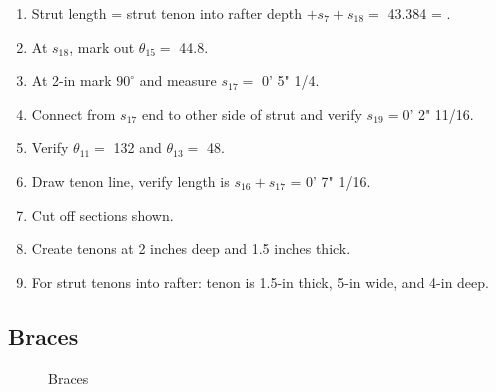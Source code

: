 \documentclass{article}\usepackage[]{graphicx}\usepackage[]{xcolor}
\begin{document}
\begin{center}\end{center}

\begin{enumerate}
  \item Strut length = strut tenon into rafter depth $+s_7 + s_{18} = $ 43.384 = .
  \item At $s_{18}$, mark out $\theta_{15} = $ 44.8.
  \item At 2-in mark $90^\circ$ and measure $s_{17} = $ 0' 5" 1/4.
  \item Connect from $s_{17}$ end to other side of strut and verify $s_{19} = $0' 2" 11/16.
  \item Verify $\theta_{11} = $ 132 and $\theta_{13} = $ 48. 
  \item Draw tenon line, verify length is $s_{16} + s_{17}$ = 0' 7" 1/16.
  \item Cut off sections shown.
  \item Create tenons at 2 inches deep and 1.5 inches thick. 
  \item For strut tenons into rafter: tenon is 1.5-in thick, 5-in wide, and 4-in deep. 
\end{enumerate}




\newpage
\subsection{Braces}



\begin{figure}[h]
    \hspace{10px}
    \hspace{10px}
    \caption{Braces}
\end{figure}
\end{document}
